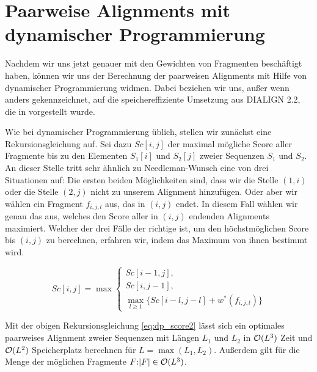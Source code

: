 \section{Paarweise Alignments mit dynamischer Programmierung}

Nachdem wir uns jetzt genauer mit den Gewichten von Fragmenten beschäftigt haben, können wir uns der Berechnung der paarweisen Alignments mit Hilfe von dynamischer Programmierung widmen. Dabei beziehen wir uns, außer wenn anders gekennzeichnet, auf die speichereffiziente Umsetzung aus DIALIGN 2.2, die in \cite{m02} vorgestellt wurde. 

Wie bei dynamischer Programmierung üblich, stellen wir zunächst eine Rekursionsgleichung auf. Sei dazu $Sc[i,j]$ der maximal mögliche Score aller Fragmente bis zu den Elementen $S_1[i]$ und $S_2[j]$ zweier Sequenzen $S_1$ und $S_2$. An dieser Stelle tritt sehr ähnlich zu Needleman-Wunsch eine von drei Situationen auf: Die ersten beiden Möglichkeiten sind, dass wir die Stelle $(1,i)$ oder die Stelle $(2,j)$ nicht zu unserem Alignment hinzufügen. Oder aber wir wählen ein Fragment $f_{i,j,l}$ aus, das in $(i,j)$ endet. In diesem Fall wählen wir genau das aus, welches den Score aller in $(i,j)$ endenden Alignments maximiert. Welcher der drei Fälle der richtige ist, um den höchstmöglichen Score bis $(i,j)$ zu berechnen, erfahren wir, indem das Maximum von ihnen bestimmt wird.

\begin{equation}\label{eq:dp_score2}
	Sc[i,j] = \max
	\begin{cases}
		Sc[i-1,j], \\
		Sc[i,j-1], \\
		\max_{l\geq 1}\{Sc[i\!-\!l,j\!-\!l] + w^*(f_{i,j,l})\}
	\end{cases}
\end{equation}

\begin{satz}[{\cite{m02}}]
	Mit der obigen Rekursionsgleichung \eqref{eq:dp_score2} lässt sich ein optimales paarweises Alignment zweier Sequenzen mit Längen $L_1$ und $L_2$ in $\mathcal{O}(L^3)$ Zeit und $\mathcal{O}(L^2)$ Speicherplatz berechnen für $L = \max(L_1, L_2)$. Außerdem gilt für die Menge der möglichen Fragmente $F{:} |F| \in \mathcal{O}(L^3)$.
\end{satz}
	
